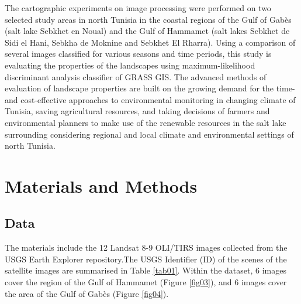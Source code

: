 \documentclass[environments,article,submit,pdftex,moreauthors]{Definitions/mdpi}
\begin{document}
The cartographic experiments on image processing were performed on two selected study areas in north Tunisia in the coastal regions of the Gulf of Gabès (salt lake Sebkhet en Noual) and the Gulf of Hammamet (salt lakes Sebkhet de Sidi el Hani, Sebkha de Moknine and Sebkhet El Rharra). Using a comparison of several images classified for various seasons and time periods, this study is evaluating the properties of the landscapes using maximum-likelihood discriminant analysis classifier of GRASS GIS. The advanced methods of evaluation of landscape properties are built on the growing demand for the time- and cost-effective approaches to environmental monitoring in changing climate of Tunisia, saving agricultural resources, and taking decisions of farmers and environmental planners to make use of the renewable resources in the salt lake surrounding considering regional and local climate and environmental settings of north Tunisia.

\section{Materials and Methods}

\subsection{Data}

The materials include the 12 Landsat 8-9 OLI/TIRS images collected from the USGS Earth Explorer repository.The USGS Identifier (ID) of the scenes of the satellite images are summarised in Table \ref{tab01}. Within the dataset, 6 images cover the region of the Gulf of Hammamet (Figure \ref{fig03}), and 6 images cover the area of the Gulf of Gabès (Figure \ref{fig04}). 
\end{document}
